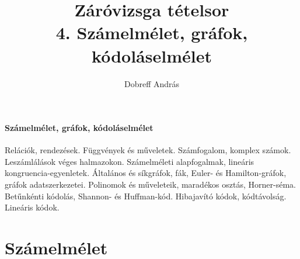 \documentclass[margin=0px]{article}
\title{Záróvizsga tételsor \\ \large 4. Számelmélet, gráfok, kódoláselmélet}
\date{}
\author{Dobreff András}
\newenvironment{tetel}[1]{\paragraph{#1 \\}}{}
\begin{document}
	\maketitle
	
	\begin{tetel}{Számelmélet, gráfok, kódoláselmélet}
			Relációk, rendezések. Függvények és műveletek. Számfogalom, komplex számok. Leszámlálások véges halmazokon. Számelméleti alapfogalmak, lineáris kongruencia-egyenletek. Általános és síkgráfok, fák, Euler- és Hamilton-gráfok, gráfok adatszerkezetei. Polinomok és műveleteik, maradékos osztás, Horner-séma. Betűnkénti kódolás, Shannon- és Huffman-kód. Hibajavító kódok, kódtávolság. Lineáris kódok.
	\end{tetel}
	\section{Számelmélet}
\end{document}
